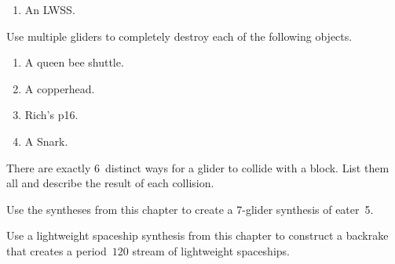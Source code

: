 \begin{multicols}{2}
\begin{problem}
\begin{enumerate}[label=\bf\color{ocre}(\alph*)]
			\item An LWSS.
		\end{enumerate}
	\end{problem}
	
	
	\mfilbreak
	
	
	\begin{problem}\label{exer:multiple_glider_cleanup}
		Use multiple gliders to completely destroy each of the following objects.
		
		\begin{enumerate}[label=\bf\color{ocre}(\alph*)]
			\item A queen bee shuttle.
			
			\item A copperhead.
			
			\item Rich's p16.
			
			\item A Snark.
		\end{enumerate}
	\end{problem}
	
	
	\mfilbreak
	
	
	\begin{problemstar}\label{exer:glider_block_collisions}
		There are exactly $6$~distinct ways for a glider to collide with a block. List them all and describe the result of each collision.
	\end{problemstar}
	
	
	\mfilbreak
	
	
	\begin{problemstar}\label{exer:twit_synthesis}
		Use the syntheses from this chapter to create a 7-glider synthesis of eater~5.
	\end{problemstar}
	
	
	\mfilbreak
	
	
	\begin{problem}\label{exer:p60_lwss_backrake}
		Use a lightweight spaceship synthesis from this chapter to construct a backrake that creates a period~$120$ stream of lightweight spaceships.
	\end{problem}
	
	
	\mfilbreak
	

\end{multicols}
